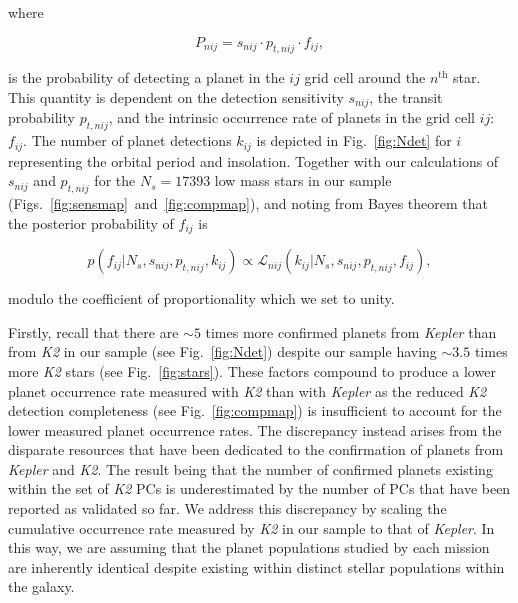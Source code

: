 \documentclass[twocolumn]{emulateapj}
\newcommand{\kepler}[1]{\emph{Kepler}#1}
\newcommand{\ktwo}[1]{\emph{K2}#1}
\begin{document}
\noindent where

\begin{equation}
  P_{nij} = s_{nij} \cdot p_{t,nij} \cdot f_{ij},
  \label{eq:prob}
\end{equation}

\noindent is the probability of detecting a planet in the $ij$ grid cell around the $n^{\text{th}}$ star.
This quantity is dependent on the detection sensitivity $s_{nij}$, the transit probability $p_{t,nij}$, and the 
intrinsic occurrence rate of planets in the grid cell $ij$: $f_{ij}$.
The number of planet detections $k_{ij}$ is depicted in Fig.~\ref{fig:Ndet} for $i$ representing the
orbital period and insolation. Together with our calculations of $s_{nij}$ and $p_{t,nij}$ for the $N_s=17393$
low mass stars in our sample (Figs.~\ref{fig:sensmap}~and~\ref{fig:compmap}), and noting from Bayes theorem
that the posterior probability of $f_{ij}$ is 

\begin{equation}
  p(f_{ij}|N_s,s_{nij},p_{t,nij},k_{ij}) \propto \mathcal{L}_{nij}(k_{ij}|N_s,s_{nij},p_{t,nij},f_{ij}),
\end{equation}
  
\noindent modulo the coefficient of proportionality which we set to unity.

Firstly, recall that there are $\sim 5$ times more confirmed planets from \kepler{} than from \ktwo{}
in our sample
(see Fig.~\ref{fig:Ndet}) despite our sample having $\sim 3.5$ times more \ktwo{} stars 
(see Fig.~\ref{fig:stars}). These factors compound to produce a lower planet occurrence rate measured
with \ktwo{} than with \kepler{} as the reduced \ktwo{} detection completeness %
(see Fig.~\ref{fig:compmap}) is insufficient to account for the lower measured
planet occurrence rates. The discrepancy instead arises from the disparate resources that have
been dedicated to the confirmation of planets from \kepler{} and \ktwo{.} The result being that
the number of confirmed planets existing within the set of \ktwo{} PCs is underestimated
by the number of PCs that have been reported as validated so far. We address this discrepancy
by scaling the cumulative occurrence rate measured by \ktwo{} in our sample to that of \kepler{.}
In this way, we are assuming that the planet populations studied by each mission are inherently
identical despite existing within distinct stellar populations within the galaxy.
\end{document}
